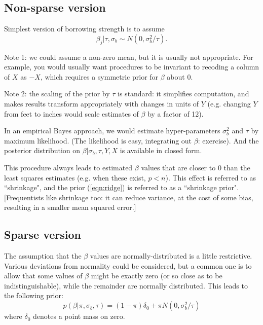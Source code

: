 \documentclass{article}
\begin{document}
\subsection{Non-sparse version}

Simplest version of borrowing strength is to assume 
\begin{equation} \label{eqn:ridge}
\beta_j |\tau, \sigma_b \sim N(0,\sigma_b^2/\tau). 
\end{equation}

Note 1: we could assume a non-zero mean,
but it is usually not appropriate. For example, you would usually want procedures to be invariant to recoding a column of $X$ as $-X$, which 
requires a symmetric prior for $\beta$ about 0.

Note 2: the scaling of the prior by $\tau$ is standard: it simplifies
computation, and makes results transform appropriately with
changes in units of $Y$ (e.g. changing $Y$ from feet to inches would scale
estimates of $\beta$ by a factor of 12).

In an empirical Bayes approach, we would estimate hyper-parameters $\sigma_b^2$ and $\tau$ by maximum likelihood. (The likelihood is easy,
integrating out $\beta$: exercise). And the 
posterior distribution on $\beta | \sigma_b, \tau, Y,X$ is available in closed form.

This procedure always leads to estimated $\beta$ values that are closer
to 0 than the least squares estimates (e.g. when these exist, $p<n$). 
This effect is referred to as ``shrinkage", and the prior (\ref{eqn:ridge}) is 
referred to as a ``shrinkage prior". 
[Frequentists like shrinkage too: it can reduce variance, at the cost of
some bias, resulting in a smaller mean squared error.]

\subsection{Sparse version}

The assumption that the $\beta$ values are normally-distributed is a little
restrictive. Various deviations from normality could be considered,
but a common one is to allow that some values of $\beta$ might be
exactly zero (or so close as to be indistinguishable), while
the remainder are normally distributed.
This leads to the following prior:
\begin{equation}
p(\beta | \pi, \sigma_b, \tau) = (1-\pi) \delta_0 + \pi N(0,\sigma_b^2/\tau)
\end{equation}
where $\delta_0$ denotes a point mass on zero.
\end{document}
